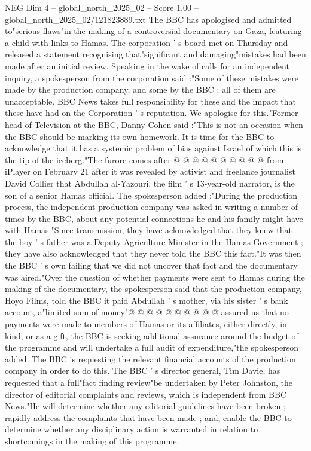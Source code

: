 \begin{textsample}{NEG Dim 4 – global\_north\_2025\_02 – Score 1.00 – global\_north\_2025\_02/121823889.txt}  \label{ex:f4_neg_403}
The BBC has apologised and admitted to"serious flaws"in the making of a controversial documentary on Gaza, featuring a child with links to Hamas.
The corporation ' s board met on Thursday and released a statement recognising that"significant and damaging"mistakes had been made after an initial review.
Speaking in the wake of calls for an independent inquiry, a spokesperson from the corporation said :"Some of these mistakes were made by the production company, and some by the BBC ; all of them are unacceptable.
BBC News takes full responsibility for these and the impact that these have had on the Corporation ' s reputation.
We apologise for this."Former head of Television at the BBC, Danny Cohen said :"This is not an occasion when the BBC should be marking its own homework.
It is time for the BBC to acknowledge that it has a systemic problem of bias against Israel of which this is the tip of the iceberg."The furore comes after @ @ @ @ @ @ @ @ @ @ from iPlayer on February 21 after it was revealed by activist and freelance journalist David Collier that Abdullah al-Yazouri, the film ' s 13-year-old narrator, is the son of a senior Hamas official.
The spokesperson added :"During the production process, the independent production company was asked in writing a number of times by the BBC, about any potential connections he and his family might have with Hamas."Since transmission, they have acknowledged that they knew that the boy ' s father was a Deputy Agriculture Minister in the Hamas Government ; they have also acknowledged that they never told the BBC this fact."It was then the BBC ' s own failing that we did not uncover that fact and the documentary was aired."Over the question of whether payments were sent to Hamas during the making of the documentary, the spokesperson said that the production company, Hoyo Films, told the BBC it paid Abdullah ' s mother, via his sister ' s bank account, a"limited sum of money"@ @ @ @ @ @ @ @ @ @ assured us that no payments were made to members of Hamas or its affiliates, either directly, in kind, or as a gift, the BBC is seeking additional assurance around the budget of the programme and will undertake a full audit of expenditure,"the spokesperson added.
The BBC is requesting the relevant financial accounts of the production company in order to do this.
The BBC ' s director general, Tim Davie, has requested that a full"fact finding review"be undertaken by Peter Johnston, the director of editorial complaints and reviews, which is independent from BBC News."He will determine whether any editorial guidelines have been broken ; rapidly address the complaints that have been made ; and, enable the BBC to determine whether any disciplinary action is warranted in relation to shortcomings in the making of this programme.

\end{textsample}
